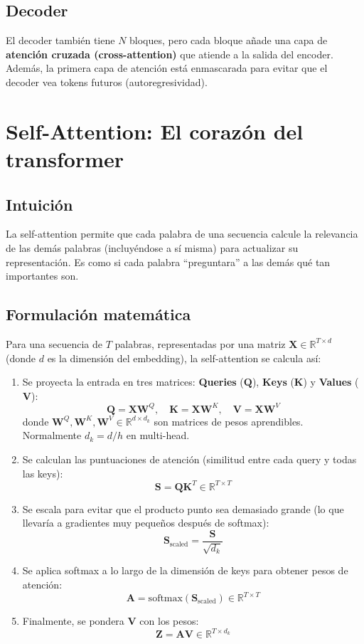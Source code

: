\documentclass[12pt,a4paper,openany,oneside]{book}
\begin{document}
\subsection{Decoder}
El decoder también tiene \(N\) bloques, pero cada bloque añade una capa de \textbf{atención cruzada (cross-attention)} que atiende a la salida del encoder. Además, la primera capa de atención está enmascarada para evitar que el decoder vea tokens futuros (autoregresividad).

\section{Self-Attention: El corazón del transformer}

\subsection{Intuición}
La self-attention permite que cada palabra de una secuencia calcule la relevancia de las demás palabras (incluyéndose a sí misma) para actualizar su representación. Es como si cada palabra ``preguntara'' a las demás qué tan importantes son.

\subsection{Formulación matemática}
Para una secuencia de \(T\) palabras, representadas por una matriz \(\mathbf{X} \in \mathbb{R}^{T \times d}\) (donde \(d\) es la dimensión del embedding), la self-attention se calcula así:

\begin{enumerate}
    \item Se proyecta la entrada en tres matrices: \textbf{Queries} (\(\mathbf{Q}\)), \textbf{Keys} (\(\mathbf{K}\)) y \textbf{Values} (\(\mathbf{V}\)):
    \[
    \mathbf{Q} = \mathbf{X} \mathbf{W}^Q,\quad 
    \mathbf{K} = \mathbf{X} \mathbf{W}^K,\quad 
    \mathbf{V} = \mathbf{X} \mathbf{W}^V
    \]
    donde \(\mathbf{W}^Q, \mathbf{W}^K, \mathbf{W}^V \in \mathbb{R}^{d \times d_k}\) son matrices de pesos aprendibles. Normalmente \(d_k = d/h\) en multi-head.

    \item Se calculan las puntuaciones de atención (similitud entre cada query y todas las keys):
    \[
    \mathbf{S} = \mathbf{Q} \mathbf{K}^T \in \mathbb{R}^{T \times T}
    \]

    \item Se escala para evitar que el producto punto sea demasiado grande (lo que llevaría a gradientes muy pequeños después de softmax):
    \[
    \mathbf{S}_{\text{scaled}} = \frac{\mathbf{S}}{\sqrt{d_k}}
    \]

    \item Se aplica softmax a lo largo de la dimensión de keys para obtener pesos de atención:
    \[
    \mathbf{A} = \text{softmax}(\mathbf{S}_{\text{scaled}}) \in \mathbb{R}^{T \times T}
    \]

    \item Finalmente, se pondera \(\mathbf{V}\) con los pesos:
    \[
    \mathbf{Z} = \mathbf{A} \mathbf{V} \in \mathbb{R}^{T \times d_k}
    \]
\end{enumerate}
\end{document}
